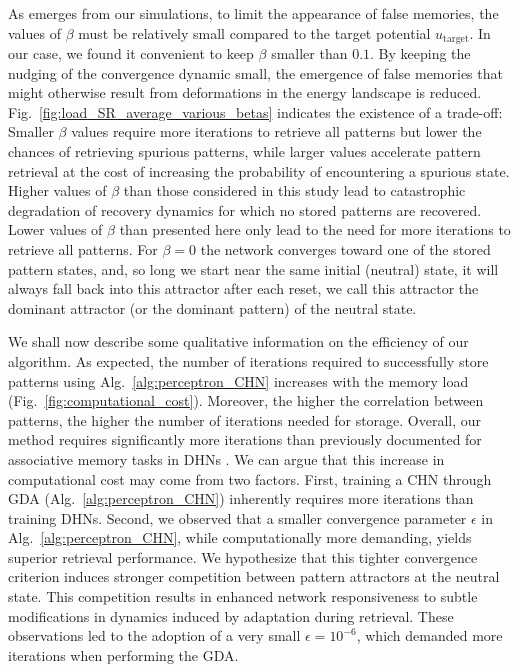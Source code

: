 \documentclass[10pt,letterpaper]{article}
\begin{document}
As emerges from our simulations, to limit the appearance of false memories, the values of $\beta$ must be relatively small compared to the target potential $u_{\text{target}}$. In our case, we found it convenient to keep $\beta$ smaller than $0.1$. By keeping the nudging of the convergence dynamic small, the emergence of false memories that might otherwise result from deformations in the energy landscape is reduced.
Fig.~\ref{fig:load_SR_average_various_betas} indicates the existence of a trade-off: Smaller $\beta$ values require more iterations to retrieve all patterns but lower the chances of retrieving spurious patterns, while larger values accelerate pattern retrieval at the cost of increasing the probability of encountering a spurious state. Higher values of $\beta$ than those considered in this study lead to catastrophic degradation of recovery dynamics for which no stored patterns are recovered.
Lower values of $\beta$ than presented here only lead to the need for more iterations to retrieve all patterns. For $\beta = 0$ the network converges toward one of the stored pattern states, and, so long we start near the same initial (neutral) state, it will always fall back into this attractor after each reset, we call this attractor the dominant attractor (or the dominant pattern) of the neutral state.

We shall now describe some qualitative information on the efficiency of our algorithm. As expected, the number of iterations required to successfully store patterns using Alg.~\ref{alg:perceptron_CHN} increases with the memory load (Fig.~\ref{fig:computational_cost}). 
Moreover, the higher the correlation between patterns, the higher the number of iterations needed for storage. Overall, our method requires significantly more iterations than previously documented for associative memory tasks in DHNs \cite{diederich_learning_1987}. 
We can argue that this increase in computational cost may come from two factors. First, training a CHN through GDA (Alg.~\ref{alg:perceptron_CHN}) inherently requires more iterations than training DHNs. Second, we observed that a smaller convergence parameter $\epsilon$ in Alg.~\ref{alg:perceptron_CHN}, while computationally more demanding, yields superior retrieval performance. We hypothesize that this tighter convergence criterion induces stronger competition between pattern attractors at the neutral state. This competition results in enhanced network responsiveness to subtle modifications in dynamics induced by adaptation during retrieval. These observations led to the adoption of a very small $\epsilon =10^{-6}$, which demanded more iterations when performing the GDA.
\end{document}
